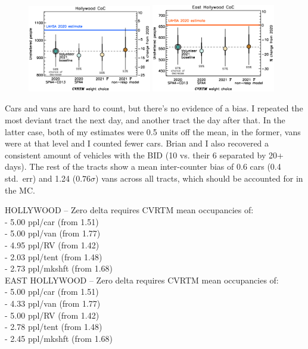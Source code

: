 \documentclass[11pt]{article}
\begin{document}
\begin{figure}[]
	\centering
	\includegraphics[width = 0.48\textwidth, trim = 1cm 0cm 0cm 1cm]{hwoodFinal}
	\includegraphics[width = 0.48\textwidth, trim = 1cm 0cm 0cm 1cm]{ehoFinal}
	\caption{}
	\label{fig:wtComp}
\end{figure}


Cars and vans are hard to count, but there's no evidence of a bias. I repeated the most deviant tract the next day, 
and another tract the day after that. In the latter case, both of my estimates were 0.5 units off the mean, in the 
former, vans were at that level and I counted fewer cars. Brian and I also recovered a consistent amount of vehicles 
with the BID (10 vs. their 6 separated by 20+ days). The rest of the tracts show a mean inter-counter bias of 0.6 
cars (0.4 std.~err) and 1.24 ($0.76\sigma$) vans across all tracts, which should be accounted for in the MC.


HOLLYWOOD -- Zero delta requires CVRTM mean occupancies of:\\
 - 5.00 ppl/car (from 1.51)\\
 - 5.00 ppl/van (from 1.77)\\
 - 4.95 ppl/RV (from 1.42)\\
 - 2.03 ppl/tent (from 1.48)\\
 - 2.73 ppl/mkshft (from 1.68)\\

EAST HOLLYWOOD -- Zero delta requires CVRTM mean occupancies of:\\
 - 5.00 ppl/car (from 1.51)\\
 - 4.33 ppl/van (from 1.77)\\
 - 5.00 ppl/RV (from 1.42)\\
 - 2.78 ppl/tent (from 1.48)\\
 - 2.45 ppl/mkshft (from 1.68)
\end{document}
